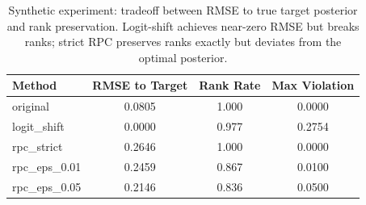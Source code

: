 \begin{table}[t]
\centering
\caption{Synthetic experiment: tradeoff between RMSE to true target posterior and rank preservation. Logit-shift achieves near-zero RMSE but breaks ranks; strict RPC preserves ranks exactly but deviates from the optimal posterior.}
\label{tab:synthetic}
\begin{tabular}{lccc}
\toprule
Method & RMSE to Target & Rank Rate & Max Violation \\
\midrule
original & 0.0805 & 1.000 & 0.0000 \\
logit\_shift & 0.0000 & 0.977 & 0.2754 \\
rpc\_strict & 0.2646 & 1.000 & 0.0000 \\
rpc\_eps\_0.01 & 0.2459 & 0.867 & 0.0100 \\
rpc\_eps\_0.05 & 0.2146 & 0.836 & 0.0500 \\
\bottomrule
\end{tabular}
\end{table}
